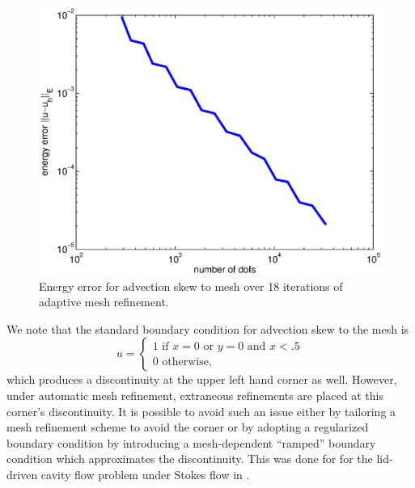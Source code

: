 \documentclass[final,leqno]{siamltex}
\begin{document}
\begin{figure}[!h]
\centering
\includegraphics[scale=.45]{figs/rates/eps5e7SkewToMesh.eps}
\caption{Energy error for advection skew to mesh over 18 iterations of adaptive mesh refinement.}
\end{figure}

We note that the standard boundary condition for advection skew to the mesh is 
\[
u = \begin{cases}
1 \text{ if } x = 0 \text{ or } y = 0 \text{ and } x< .5\\
0 \text{ otherwise},
\end{cases}
\]
which produces a discontinuity at the upper left hand corner as well.  However, under automatic mesh refinement, extraneous refinements are placed at this corner's discontinuity.  It is possible to avoid such an issue either by tailoring a mesh refinement scheme to avoid the corner or by adopting a regularized boundary condition by introducing a mesh-dependent ``ramped'' boundary condition which approximates the discontinuity.  This was done for for the lid-driven cavity flow problem under Stokes flow in \cite{stokesDPG}.  
\end{document}
